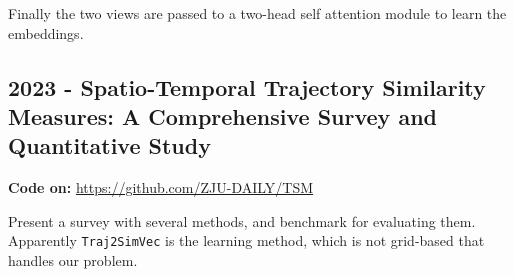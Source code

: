 Finally the two views are passed to a two-head self attention module to learn the embeddings.




\subsection*{2023 - Spatio-Temporal Trajectory Similarity Measures: A Comprehensive Survey and Quantitative Study}
\cite{hu2023spatio}

\textbf{Code on:} \url{https://github.com/ZJU-DAILY/TSM}

Present a survey with several methods, and benchmark for evaluating them. Apparently \texttt{Traj2SimVec} \cite{zhang2020trajectory} is the learning method, which is not grid-based that handles our problem.